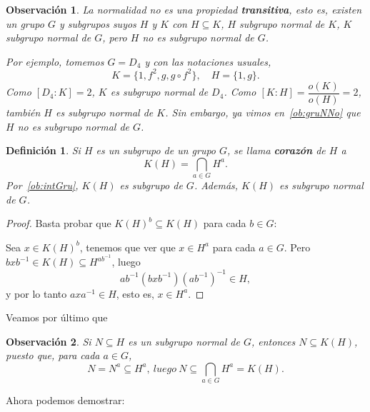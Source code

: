\documentclass[12pt]{article}
\newtheorem{definition}[theorem]{Definición}
\newtheorem{observation}{Observación}[theorem]
\begin{document}
\begin{observation}La normalidad no es una propiedad \textbf{transitiva}, esto es, existen un grupo $G$ y subgrupos suyos $H$ y $K$ con $H \subseteq K$, $H$ subgrupo normal de $K$, $K$ subgrupo normal de $G$, pero $H$ no es subgrupo normal de $G$.

Por ejemplo, tomemos $G = D_4$ y con las notaciones usuales, $$K = \lbrace 1, f^2, g, g \circ f^2 \rbrace, \quad H = \lbrace 1,g \rbrace.$$ Como $[D_4 : K ] = 2$, $K$ es subgrupo normal de $D_4$. Como $[K:H] = \dfrac{o(K)}{o(H)} = 2$, también $H$ es subgrupo normal de $K$. Sin embargo, ya vimos en~\ref{ob:gruNNo} que $H$ no es subgrupo normal de $G$.
\end{observation}

\begin{definition}Si $H$ es un subgrupo de un grupo $G$, se llama \textbf{corazón} de $H$ a $$K(H) = \bigcap_{a\in G} H^a.$$ Por~\ref{ob:intGru}, $K(H)$ es subgrupo de $G$. Además, $K(H)$ es subgrupo normal de $G$.
\end{definition}
\begin{proof}
Basta probar que $K(H)^{b} \subseteq K(H)$ para cada $b \in G$:

Sea $x \in K(H)^{b}$, tenemos que ver que $x \in H^{a}$ para cada $a \in G$. Pero $
bxb^{-1} \in K(H) \subseteq H^{ab^{-1}}$, luego $$ab^{-1}(bxb^{-1})(ab^{-1})^{-1} \in H,$$ y por lo tanto $axa^{-1} \in H$, esto es, $x\in H^{a}$.

\end{proof}

Veamos por último que 

\begin{observation}Si $N \subseteq H$ es un subgrupo normal de $G$, entonces $N \subseteq K(H)$, puesto que, para cada $a \in G$, $$N = N^a \subseteq H^a,~luego~N \subseteq \bigcap_{a\in G} H^a = K(H).$$
\end{observation}

Ahora podemos demostrar:
\end{document}
